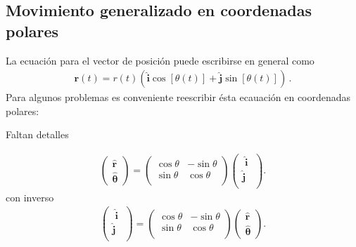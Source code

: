 \subsection{Movimiento generalizado en coordenadas polares}
La ecuaci\'on para el vector de posici\'on puede escribirse en general como
\begin{align}
\label{eq:rpol}
  \mathbf{r}(t)=r(t)\left(\hat{\mathbf{i}}\cos[\theta(t)]+\hat{\mathbf{j}}\sin[\theta(t)]\right)\,.
\end{align}
Para algunos problemas es conveniente reescribir \'esta ecauaci\'on en coordenadas polares:
\begin{inprogress}
  Faltan detalles
\end{inprogress}
\begin{align}
  \label{eq:polinv}
  \begin{pmatrix}
    \hat{\mathbf{r}}\\
    \hat{\boldsymbol{\theta}}
  \end{pmatrix}=
  \begin{pmatrix}
    \cos\theta&-\sin\theta\\
    \sin\theta&\cos\theta\\
  \end{pmatrix}
  \begin{pmatrix}
    \;\hat{\mathbf{i}}\;\\
    \hat{\mathbf{j}}\\
  \end{pmatrix}.
\end{align}
con inverso
\begin{align}
  \begin{pmatrix}
    \;\hat{\mathbf{i}}\;\\
    \hat{\mathbf{j}}\\
  \end{pmatrix}=
  \begin{pmatrix}
    \cos\theta&-\sin\theta\\
    \sin\theta&\cos\theta\\
  \end{pmatrix}
  \begin{pmatrix}
    \hat{\mathbf{r}}\\
    \hat{\boldsymbol{\theta}}
  \end{pmatrix}.
\end{align}

